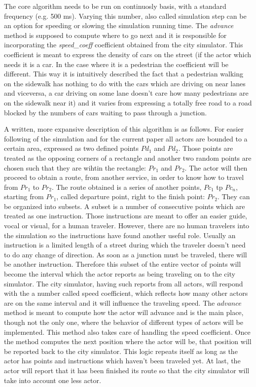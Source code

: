 \documentclass[a4paper,12pt,twoside]{book}
\begin{document}
The core algorithm needs to be run on continuosly basis, with a standard frequency (e.g. 500 ms). Varying this number, also called simulation step can be an option for speeding or slowing the simulation running time. The \textit{advance} method is supposed to compute where to go next and it is responsible for incorporating the \textit{speed\_coeff} coefficient obtained from the city simulator. This coefficient is meant to express the density of cars on the street (if the actor which needs it is a car. In the case where it is a pedestrian the coefficient will be different. This way it is intuitively described the fact that a pedestrian walking on the sidewalk has nothing to do with the cars which are driving on near lanes and viceversa, a car driving on some lane doesn't care how many pedestrians are on the sidewalk near it) and it varies from expressing a totally free road to a road blocked by the numbers of cars waiting to pass through a junction.

A written, more expansive description of this algorithm is as follows. For easier following of the simulation and for the current paper all actors are bounded to a certain area, expressed as two defined points $Pd_1$ and $Pd_2$. Those points are treated as the opposing corners of a rectangle and another two random points are chosen such that they are wihtin the rectangle: $Pr_1$ and $Pr_2$. The actor will then proceed to obtain a route, from another service, in order to know how to travel from $Pr_1$ to $Pr_2$. The route obtained is a series of another points, $Pc_1$ tp $Pc_n$, starting from $Pr_1$, called departure point, right to the finish point: $Pr_2$. They can be organized into subsets. A subset is a number of consecutive points which are treated as one instruction. Those instructions are meant to offer an easier guide, vocal or visual, for a human traveler. However, there are no human travelers into the simulation so the instructions have found another useful role. Usually an instruction is a limited length of a street during which the traveler doesn't need to do any change of direction. As soon as a junction must be traveled, there will be another instruction. Therefore this subset of the entire vector of points will become the interval which the actor reports as being traveling on to the city simulator. The city simulator, having such reports from all actors, will respond with the a number called speed coefficient, which reflects how many other actors are on the same interval and it will influence the traveling speed. The $advance$ method is meant to compute how the actor will advance and is the main place, though not the only one, where the behavior of different types of actors will be implemented. This method also takes care of handling the speed coefficient. Once the method computes the next position where the actor will be, that position will be reported back to the city simulator. This logic repeats itself as long as the actor has points and instructions which haven't been traveled yet. At last, the actor will report that it has been finished its route so that the city simulator will take into account one less actor.
\end{document}
